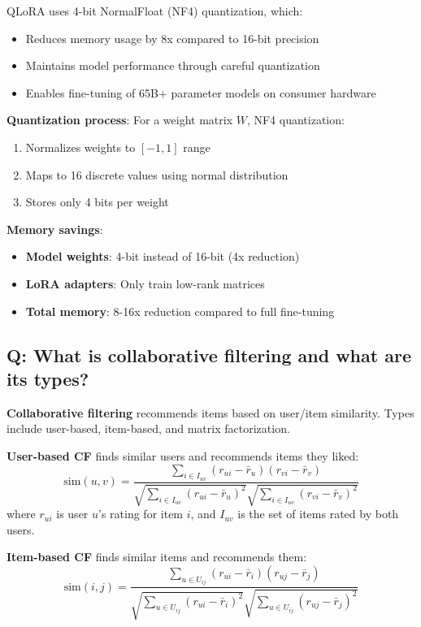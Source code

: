 QLoRA uses 4-bit NormalFloat (NF4) quantization, which:
\begin{itemize}
	\item Reduces memory usage by 8x compared to 16-bit precision
	\item Maintains model performance through careful quantization
	\item Enables fine-tuning of 65B+ parameter models on consumer hardware
\end{itemize}

\textbf{Quantization process}:
For a weight matrix \(W\), NF4 quantization:
\begin{enumerate}
	\item Normalizes weights to \([-1, 1]\) range
	\item Maps to 16 discrete values using normal distribution
	\item Stores only 4 bits per weight
\end{enumerate}

\textbf{Memory savings}:
\begin{itemize}
	\item \textbf{Model weights}: 4-bit instead of 16-bit (4x reduction)
	\item \textbf{LoRA adapters}: Only train low-rank matrices
	\item \textbf{Total memory}: 8-16x reduction compared to full fine-tuning
\end{itemize}

\subsection*{Q: What is collaborative filtering and what are its types?}
\textbf{Collaborative filtering} recommends items based on user/item similarity. Types include user-based, item-based, and matrix factorization.

\textbf{User-based CF} finds similar users and recommends items they liked:
\[
\text{sim}(u, v) = \frac{\sum_{i \in I_{uv}} (r_{ui} - \bar{r}_u)(r_{vi} - \bar{r}_v)}{\sqrt{\sum_{i \in I_{uv}} (r_{ui} - \bar{r}_u)^2} \sqrt{\sum_{i \in I_{uv}} (r_{vi} - \bar{r}_v)^2}}
\]
where \(r_{ui}\) is user \(u\)'s rating for item \(i\), and \(I_{uv}\) is the set of items rated by both users.

\textbf{Item-based CF} finds similar items and recommends them:
\[
\text{sim}(i, j) = \frac{\sum_{u \in U_{ij}} (r_{ui} - \bar{r}_i)(r_{uj} - \bar{r}_j)}{\sqrt{\sum_{u \in U_{ij}} (r_{ui} - \bar{r}_i)^2} \sqrt{\sum_{u \in U_{ij}} (r_{uj} - \bar{r}_j)^2}}
\]

